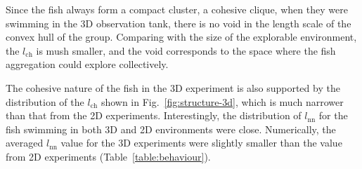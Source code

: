 \documentclass[11pt,twoside]{report}
\begin{document}
Since the fish always form a compact cluster, a cohesive clique, when they were swimming in the 3D observation tank, there is no void in the length scale of the convex hull of the group. Comparing with the size of the explorable environment, the $l_\mathrm{ch}$ is mush smaller, and the void corresponds to the space where the fish aggregation could explore collectively.

The cohesive nature of the fish in the 3D experiment is also supported by the distribution of the $l_\mathrm{ch}$ shown in Fig.~\ref{fig:structure-3d}, which is much narrower than that from the 2D experiments. Interestingly, the distribution of $l_\mathrm{nn}$ for the fish swimming in both 3D and 2D environments were close. Numerically, the averaged $l_\mathrm{nn}$ value for the 3D experiments were slightly smaller than the value from 2D experiments (Table~\ref{table:behaviour}).
\end{document}
